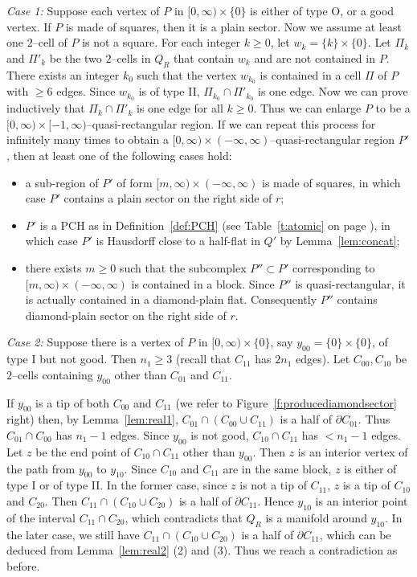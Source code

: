 \documentclass[11pt]{amsart}
\theoremstyle{definition}
\begin{document}
\emph{Case 1:} Suppose each vertex of $P$ in $[0,\infty)\times\{0\}$ is either of type O, or a good vertex. If $P$ is made of squares, then it is a plain sector. Now we assume at least one $2$--cell of $P$ is not a square. For each integer $k\ge 0$, let $w_k=\{k\}\times\{0\}$. Let $\Pi_k$ and $\Pi'_k$ be the two $2$--cells in $Q_R$ that contain $w_k$ and are not contained in $P$. There exists an integer $k_0$ such that the vertex $w_{k_0}$ is contained in a cell $\Pi$ of $P$ with $\ge 6$ edges. Since $w_{k_0}$ is of type II, $\Pi_{k_0}\cap\Pi'_{k_0}$ is one edge. Now we can prove inductively that $\Pi_k\cap \Pi'_k$ is one edge for all $k\ge 0$. Thus we can enlarge $P$ to be a $[0,\infty)\times [-1,\infty)$--quasi-rectangular region. If we can repeat this process for infinitely many times to obtain a $[0,\infty)\times(-\infty,\infty)$--quasi-rectangular region $P'$, then at least one of the following cases hold:
\begin{itemize}
	\item a sub-region of $P'$ of form $[m,\infty)\times(-\infty,\infty)$ is made of squares, in which case $P'$ contains a plain sector on the right side of $r$;
	\item $P'$ is a PCH as in Definition~\ref{def:PCH} (see Table~\ref{t:atomic} on page \pageref{t:atomic}), in which case $P'$ is Hausdorff close to a half-flat in $Q'$ by Lemma~\ref{lem:concat};
	\item there exists $m\ge 0$ such that the subcomplex $P''\subset P'$ corresponding to $[m,\infty)\times(-\infty,\infty)$ is contained in a block. Since $P''$ is quasi-rectangular, it is actually contained in a diamond-plain flat. Consequently $P''$ contains diamond-plain sector on the right side of $r$.
\end{itemize}


\emph{Case 2:} Suppose there is a vertex of $P$ in $[0,\infty)\times\{0\}$, say $y_{00}=\{0\}\times\{0\}$,  of type I but not good. Then $n_1\ge 3$ (recall that $C_{11}$ has $2n_1$ edges). Let $C_{00},C_{10}$ be $2$--cells containing $y_{00}$ other than $C_{01}$ and $C_{11}$. 

If $y_{00}$ is a tip of both $C_{00}$ and $C_{11}$ (we refer to Figure~\ref{f:producediamondsector} right) then, by Lemma~\ref{lem:real1}, $C_{01}\cap (C_{00}\cup C_{11})$ is a half of $\partial C_{01}$. Thus $C_{01}\cap C_{00}$ has $n_1-1$ edges. Since $y_{00}$ is not good, $C_{10}\cap C_{11}$ has $<n_1-1$ edges. Let $z$ be the end point of $C_{10}\cap C_{11}$ other than $y_{00}$. Then $z$ is an interior vertex of the path from $y_{00}$ to $y_{10}$. Since $C_{10}$ and $C_{11}$ are in the same block, $z$ is either of type I or of type II. In the former case, since $z$ is not a tip of $C_{11}$, $z$ is a tip of $C_{10}$ and $C_{20}$. Then $C_{11}\cap(C_{10}\cup C_{20})$ is a half of $\partial C_{11}$. Hence $y_{10}$ is an interior point of the interval $C_{11}\cap C_{20}$, which contradicts that $Q_R$ is a manifold around $y_{10}$. In the later case, we still have $C_{11}\cap(C_{10}\cup C_{20})$ is a half of $\partial C_{11}$, which can be deduced from Lemma~\ref{lem:real2} (2) and (3). Thus we reach a contradiction as before.
\end{document}
